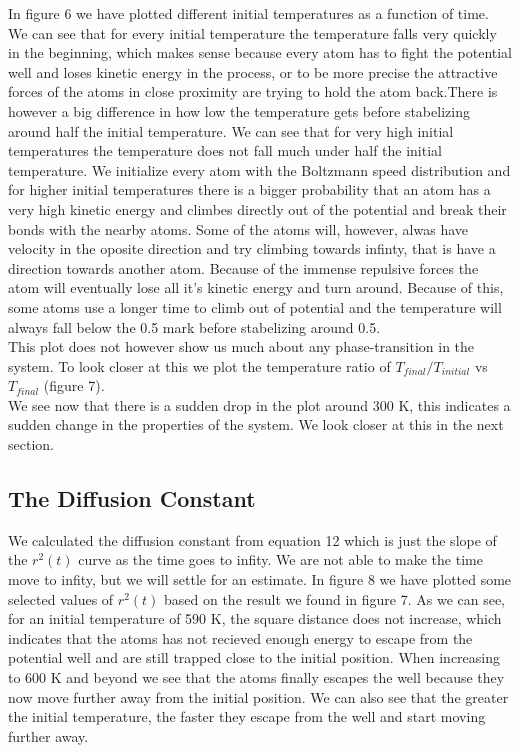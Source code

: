 \documentclass[a4paper, 12pt]{article}
\begin{document}
In figure 6 we have plotted different initial temperatures as a function of time. We can see that for every initial temperature the temperature falls  very quickly in the beginning, which makes sense because every atom has to fight the potential well and loses kinetic energy in the process, or to be more precise the attractive forces of the atoms in close proximity are trying to hold the atom back.There is however a big difference in how low the temperature gets before stabelizing around half the initial temperature. We can see that for very high initial temperatures the temperature does not fall much under half the initial temperature. We initialize every atom with the Boltzmann speed distribution and for higher initial temperatures there is a bigger probability that an atom has a very high kinetic energy and climbes directly out of the potential and break their bonds with the nearby atoms. Some of the atoms will, however, alwas have velocity in the oposite direction and try climbing towards infinty, that is have a direction towards another atom. Because of the immense repulsive forces the atom will eventually lose all it's kinetic energy and turn around. Because of this, some atoms use a longer time to climb out of potential and the temperature will always fall below the 0.5 mark before stabelizing around 0.5.\\

This plot does not however show us much about any phase-transition in the system. To look closer at this we plot the temperature ratio of $T_{final}/T_{initial}$ vs $T_{final}$ (figure 7). \\
We see now that there is a sudden drop in the plot around 300 K, this indicates a sudden change in the properties of the system. We look closer at this in the next section.
\subsection{The Diffusion Constant}
We calculated the diffusion constant from equation 12 which is just the slope of the $r^2 (t)$ curve as the time goes to infity. We are not able to make the time move to infity, but we will settle for an estimate. In figure 8 we have plotted some selected values of $r^2(t)$ based on the result we found in figure 7. As we can see, for an initial temperature of 590 K, the square distance does not increase, which indicates that the atoms has not recieved enough energy to escape from the potential well and are still trapped close to the initial position. When increasing to 600 K and beyond we see that the atoms finally escapes the well because they now move further away from the initial position. We can also see that the greater the initial temperature, the faster they escape from the well and start moving further away.\\
\end{document}

